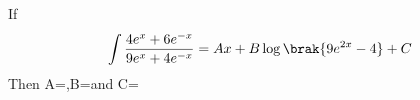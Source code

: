 \iffalse
  \title{Assignment}
  \author{Abhijeet Kumar - ai24btech11001}
  \section{fitb}
\fi
  \item If 
\begin{align*}
    \int\frac{4e^{x}+ 6e^{-x}}{9e^{x} + 4e^{-x}} = Ax+B\log\brak{9e^{2x}-4} + C
\end{align*}
Then A=\dotso,B=\dotso and C=\dotso
\hfill {}
% 
